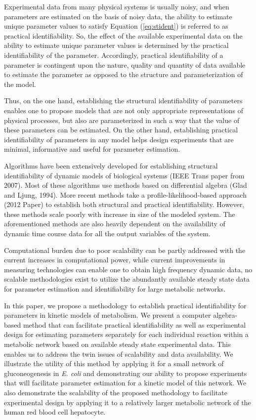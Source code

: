 \documentclass[10pt]{article}
\begin{document}
Experimental data from many physical systems is usually noisy, and when parameters are estimated on the basis of noisy data, the ability to estimate unique parameter values to satisfy Equation (\ref{eq:stident}) is referred to as practical identifiability. So, the effect of the available experimental data on the ability to estimate unique parameter values is determined by the practical identifiability of the parameter. Accordingly, practical identifiability of a parameter is contingent upon the nature, quality and quantity of data available to estimate the parameter as opposed to the structure and parameterization of the model. 

Thus, on the one hand, establishing the structural identifiability of parameters enables one to propose models that are not only appropriate representations of physical processes, but also are parameterized in such a way that the value of these parameters can be estimated. On the other hand, establishing practical identifiability of parameters in any model helps design experiments that are minimal, informative and useful for parameter estimation.

Algorithms have been extensively developed for establishing structural identifiability of dynamic models of biological systems (IEEE Trans paper from 2007). Most of these algorithms use methods based on differential algebra (Glad and Ljung, 1994). More recent methods take a profile-likelihood-based approach (2012 Paper) to establish both structural and practical identifiability. However, these methods scale poorly with increase in size of the modeled system. The aforementioned methods are also heavily dependent on the availability of dynamic time course data for all the output variables of the system. 

Computational burden due to poor scalability can be partly addressed with the current increases in computational power, while current improvements in measuring technologies can enable one to obtain high frequency dynamic data, no scalable methodologies exist to utilize the abundantly available steady state data for parameter estimation and identifiability for large metabolic networks. 

In this paper, we propose a methodology to establish practical identifiability for parameters in kinetic models of metabolism. We present a computer algebra-based method that can facilitate practical identifiability as well as experimental design for estimating parameters separately for each individual reaction within a metabolic network based on available steady state experimental data. This enables us to address the twin issues of scalability and data availability. We illustrate the utility of this method by applying it for a small network of gluconeogenesis in \textit{E. coli} and demonstrating our ability to propose experiments that will facilitate parameter estimation for a kinetic model of this network. We also demonstrate the scalability of the proposed methodology to facilitate experimental design by applying it to a relatively larger metabolic network of the human red blood cell hepatocyte. 	
\end{document}
